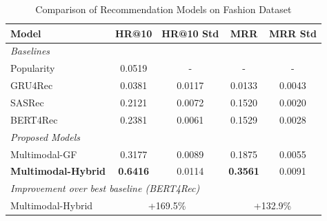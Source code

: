
\begin{table}[htbp]
\centering
\caption{Comparison of Recommendation Models on Fashion Dataset}
\label{tab:model_comparison}
\begin{tabular}{l|cc|cc}
\toprule
\textbf{Model} & \textbf{HR@10} & \textbf{HR@10 Std} & \textbf{MRR} & \textbf{MRR Std} \\
\midrule
\multicolumn{5}{l}{\textit{Baselines}} \\
Popularity & 0.0519 & - & - & - \\
GRU4Rec & 0.0381 & 0.0117 & 0.0133 & 0.0043 \\
SASRec & 0.2121 & 0.0072 & 0.1520 & 0.0020 \\
BERT4Rec & 0.2381 & 0.0061 & 0.1529 & 0.0028 \\
\midrule
\multicolumn{5}{l}{\textit{Proposed Models}} \\
Multimodal-GF & 0.3177 & 0.0089 & 0.1875 & 0.0055 \\
\textbf{Multimodal-Hybrid} & \textbf{0.6416} & 0.0114 & \textbf{0.3561} & 0.0091 \\
\midrule
\multicolumn{5}{l}{\textit{Improvement over best baseline (BERT4Rec)}} \\
Multimodal-Hybrid & \multicolumn{2}{c|}{+169.5\%} & \multicolumn{2}{c}{+132.9\%} \\
\bottomrule
\end{tabular}
\end{table}
